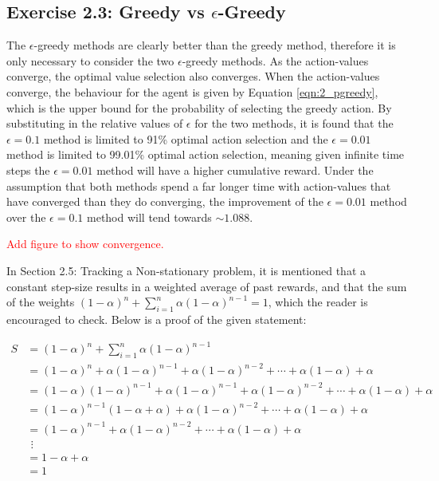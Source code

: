 \subsection*{Exercise 2.3: Greedy vs \boldmath$\epsilon$-Greedy}

The $\epsilon$-greedy methods are clearly better than the greedy method, therefore it is only necessary to consider the two $\epsilon$-greedy methods. As the action-values converge, the optimal value selection also converges. When the action-values converge, the behaviour for the agent is given by Equation \ref{eqn:2_pgreedy}, which is the upper bound for the probability of selecting the greedy action. By substituting in the relative values of $\epsilon$ for the two methods, it is found that the $\epsilon=0.1$ method is limited to 91\% optimal action selection and the $\epsilon=0.01$ method is limited to 99.01\% optimal action selection, meaning given infinite time steps the $\epsilon=0.01$ method will have a higher cumulative reward. Under the assumption that both methods spend a far longer time with action-values that have converged than they do converging, the improvement of the $\epsilon=0.01$ method over the $\epsilon=0.1$ method will tend towards $\sim 1.088$.

\textcolor{red}{Add figure to show convergence.}

\begin{tcolorbox}
In Section 2.5: Tracking a Non-stationary problem, it is mentioned that a constant step-size results in a weighted average of past rewards, and that the sum of the weights $(1-\alpha)^n + \sum_{i=1}^{n} \alpha(1-\alpha)^{n-1}=1$, which the reader is encouraged to check. Below is a proof of the given statement: 

\vspace{-6mm}
\begin{align*}
S &= (1-\alpha)^n + \sum_{i=1}^{n} \alpha(1-\alpha)^{n-1}  \\
&= (1-\alpha)^n + \alpha(1-\alpha)^{n-1} + \alpha(1-\alpha)^{n-2} + \cdots + \alpha(1-\alpha) + \alpha \\
&= (1-\alpha)(1-\alpha)^{n-1} + \alpha(1-\alpha)^{n-1} + \alpha(1-\alpha)^{n-2} + \cdots + \alpha(1-\alpha) + \alpha \\
&= (1-\alpha)^{n-1}(1-\alpha+\alpha) + \alpha(1-\alpha)^{n-2} + \cdots + \alpha(1-\alpha) + \alpha \\
&= (1-\alpha)^{n-1} + \alpha(1-\alpha)^{n-2} + \cdots + \alpha(1-\alpha) + \alpha \\
& \ \, \vdots \\
&= 1-\alpha+\alpha \\
&=1
\end{align*}

\end{tcolorbox}

